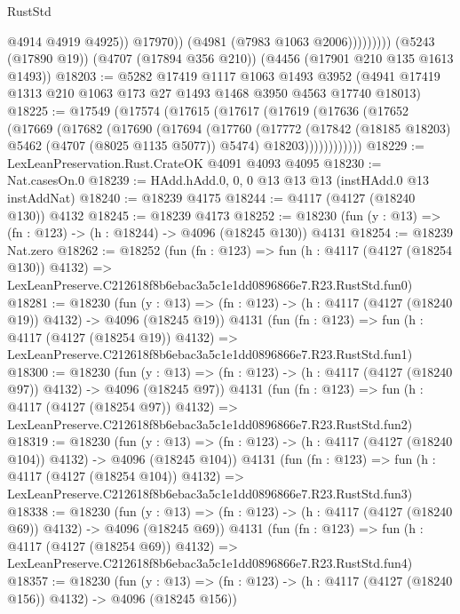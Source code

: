 \begin{lexlean}{RustStd}
\begin{coremodule}
                          @4914
                          @4919
                          @4925))
                      @17970))
                  (@4981 (@7983 @1063 @2006)))))))))
    (@5243 (@17890 @19))
    (@4707 (@17894 @356 @210))
    (@4456 (@17901 @210 @135 @1613 @1493))
@18203 := @5282
    @17419
    @1117
    @1063
    @1493
    @3952
    (@4941 @17419 @1313 @210 @1063 @173 @27 @1493 @1468 @3950 @4563 @17740 @18013)
@18225 := @17549
    (@17574
      (@17615
        (@17617
          (@17619
            (@17636
              (@17652
                (@17669
                  (@17682
                    (@17690
                      (@17694
                        (@17760
                          (@17772
                            (@17842 (@18185 @18203) @5462 (@4707 (@8025 @1135 @5077)) @5474)
                            @18203))))))))))))
@18229 := LexLeanPreservation.Rust.CrateOK @4091 @4093 @4095
@18230 := Nat.casesOn.{0}
@18239 := HAdd.hAdd.{0, 0, 0} @13 @13 @13 (instHAdd.{0} @13 instAddNat)
@18240 := @18239 @4175
@18244 := @4117 (@4127 (@18240 @130)) @4132
@18245 := @18239 @4173
@18252 := @18230 (fun (y : @13) => (fn : @123) -> (h : @18244) -> @4096 (@18245 @130)) @4131
@18254 := @18239 Nat.zero
@18262 := @18252
    (fun (fn : @123) =>
    fun (h : @4117 (@4127 (@18254 @130)) @4132) =>
    LexLeanPreserve.C212618f8b6ebac3a5c1e1dd0896866e7.R23.RustStd.fun0)
@18281 := @18230
    (fun (y : @13) => (fn : @123) -> (h : @4117 (@4127 (@18240 @19)) @4132) -> @4096 (@18245 @19))
    @4131
    (fun (fn : @123) =>
    fun (h : @4117 (@4127 (@18254 @19)) @4132) =>
    LexLeanPreserve.C212618f8b6ebac3a5c1e1dd0896866e7.R23.RustStd.fun1)
@18300 := @18230
    (fun (y : @13) => (fn : @123) -> (h : @4117 (@4127 (@18240 @97)) @4132) -> @4096 (@18245 @97))
    @4131
    (fun (fn : @123) =>
    fun (h : @4117 (@4127 (@18254 @97)) @4132) =>
    LexLeanPreserve.C212618f8b6ebac3a5c1e1dd0896866e7.R23.RustStd.fun2)
@18319 := @18230
    (fun (y : @13) => (fn : @123) -> (h : @4117 (@4127 (@18240 @104)) @4132) -> @4096 (@18245 @104))
    @4131
    (fun (fn : @123) =>
    fun (h : @4117 (@4127 (@18254 @104)) @4132) =>
    LexLeanPreserve.C212618f8b6ebac3a5c1e1dd0896866e7.R23.RustStd.fun3)
@18338 := @18230
    (fun (y : @13) => (fn : @123) -> (h : @4117 (@4127 (@18240 @69)) @4132) -> @4096 (@18245 @69))
    @4131
    (fun (fn : @123) =>
    fun (h : @4117 (@4127 (@18254 @69)) @4132) =>
    LexLeanPreserve.C212618f8b6ebac3a5c1e1dd0896866e7.R23.RustStd.fun4)
@18357 := @18230
    (fun (y : @13) => (fn : @123) -> (h : @4117 (@4127 (@18240 @156)) @4132) -> @4096 (@18245 @156))

\end{coremodule}
\end{lexlean}
